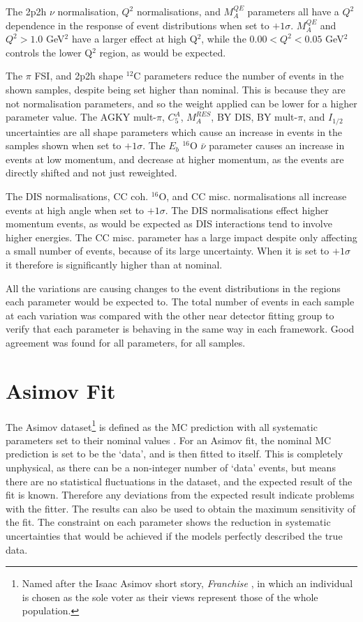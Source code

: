 The 2p2h $\nu$ normalisation, $Q^2$ normalisations, and $M^{QE}_A$ parameters all have a $Q^2$ dependence in the response of event distributions when set to $+1\sigma$. $M^{QE}_A$ and $Q^{2}>1.0$ GeV$^2$ have a larger effect at high Q$^2$, while the $0.00<Q^{2}<0.05$ GeV$^2$ controls the lower Q$^2$ region, as would be expected.

The $\pi$ FSI, and 2p2h shape $^{12}$C parameters reduce the number of events in the shown samples, despite being set higher than nominal. This is because they are not normalisation parameters, and so the weight applied can be lower for a higher parameter value. The AGKY mult-$\pi$, $C^{A}_{5}$, $M^{RES}_{A}$, BY DIS, BY mult-$\pi$, and $I_{1/2}$ uncertainties are all shape parameters which cause an increase in events in the samples shown when set to $+1\sigma$. The $E_{b}$ $^{16}$O $\bar{\nu}$ parameter causes an increase in events at low momentum, and decrease at higher momentum, as the events are directly shifted and not just reweighted.

The DIS normalisations, CC coh. $^{16}$O, and CC misc. normalisations all increase events at high angle when set to $+1\sigma$. The DIS normalisations effect higher momentum events, as would be expected as DIS interactions tend to involve higher energies. The CC misc. parameter has a large impact despite only affecting a small number of events, because of its large uncertainty. When it is set to $+1\sigma$ it therefore is significantly higher than at nominal.

All the variations are causing changes to the event distributions in the regions each parameter would be expected to. The total number of events in each sample at each variation was compared with the other near detector fitting group to verify that each parameter is behaving in the same way in each framework. Good agreement was found for all parameters, for all samples.

\section{Asimov Fit}\label{sec:asimov}

The Asimov dataset\footnote{Named after the Isaac Asimov short story, \textit{Franchise} \cite{asmv}, in which an individual is chosen as the sole voter as their views represent those of the whole population.} is defined as the MC prediction with all systematic parameters set to their nominal values \cite{Cowan_2011}. For an Asimov fit, the nominal MC prediction is set to be the `data', and is then fitted to itself. This is completely unphysical, as there can be a non-integer number of `data' events, but means there are no statistical fluctuations in the dataset, and the expected result of the fit is known. Therefore any deviations from the expected result indicate problems with the fitter. The results can also be used to obtain the maximum sensitivity of the fit. The constraint on each parameter shows the reduction in systematic uncertainties that would be achieved if the models perfectly described the true data.

